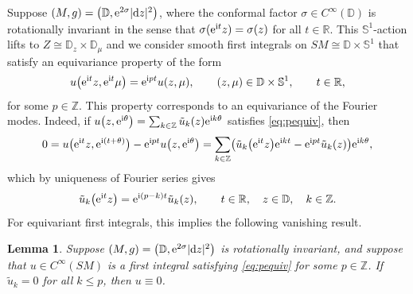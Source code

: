 \documentclass[10pt,a4paper]{amsart}
\numberwithin{equation}{section}
\newtheorem{Lemma}[Theorem]{Lemma}
\theoremstyle{definition}
\newcommand{\Z}{\mathbb{Z}} %
\newcommand{\R}{\mathbb{R}} %
\newcommand{\1}{{\bf 1}}
\newcommand \Dm { \mathbb{D}}
\newcommand \Zm { \mathbb{Z}}
\newcommand \tu {\tilde{u}}
\begin{document}
Suppose $(M,g) = \bigl(\Dm, {\rm e}^{2\sigma} |{\rm d}z|^2\bigr)$, where the conformal factor $\sigma\in C^\infty(\Dm)$ is rotationally invariant in the sense that $\sigma({\rm e}^{{\rm i}t} z) = \sigma(z)$ for all $t\in \R$. This $\mathbb S^1$-action lifts to $Z\cong \Dm_z\times \Dm_\mu$ and we consider smooth first integrals on $SM\cong \Dm\times \mathbb S^1$ that satisfy an equivariance property of the form
\begin{align}
	u \bigl({\rm e}^{{\rm i}t}z, {\rm e}^{{\rm i}t}\mu\bigr) = {\rm e}^{{\rm i}pt} u (z,\mu), \qquad (z,\mu)\in \Dm\times \mathbb S^1,\qquad t\in \R,
	\label{eq:pequiv}
\end{align}
for some $p\in \Z$. This property corresponds to an equivariance of the Fourier modes. Indeed, if $u\bigl(z,{\rm e}^{{\rm i}\theta}\bigr) = \sum_{k\in \Zm} \tu_k(z) {\rm e}^{{\rm i}k\theta}$ satisfies \eqref{eq:pequiv}, then
\begin{align*}
	0 = u \bigl({\rm e}^{{\rm i}t}z, {\rm e}^{{\rm i}(t+\theta)}\bigr) - {\rm e}^{{\rm i}pt} u \bigl(z,{\rm e}^{{\rm i}\theta}\bigr) = \sum_{k\in \Zm} \bigl( \tu_k\bigl({\rm e}^{{\rm i}t}z\bigr) {\rm e}^{{\rm i}kt} - {\rm e}^{{\rm i}pt} \tu_k(z) \bigr) {\rm e}^{{\rm i}k\theta},
\end{align*}
which by uniqueness of Fourier series gives
\begin{align}
	\tu_k\bigl({\rm e}^{{\rm i}t}z\bigr) = {\rm e}^{{\rm i}(p-k)t} \tu_k(z), \qquad t\in \R,\quad z\in \Dm,\quad k\in \Zm.
	\label{eq:modesEquiv}
\end{align}
For equivariant first integrals, this implies the following vanishing result.
\begin{Lemma}\label{lem:vanishing} Suppose $(M,g) = \bigl(\Dm, {\rm e}^{2\sigma} |{\rm d}z|^2\bigr)$ is rotationally invariant, and suppose that $u\in C^\infty(SM)$ is a first integral satisfying \eqref{eq:pequiv} for some $p\in \Zm$. If $\tu_k= 0$ for all $k\le p$, then $u\equiv 0$.
\end{Lemma}
\end{document}
